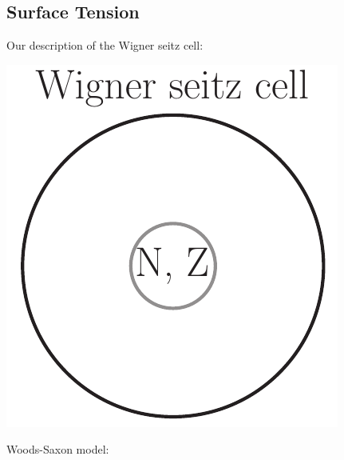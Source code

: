 \documentclass[11pt,letter]{article}
\begin{document}
\subsection{Surface Tension}
Our description of the Wigner seitz cell:
\begin{center}
 \includegraphics[scale=0.4]{WSC.pdf}
\end{center}

Woods-Saxon model:
\end{document}
